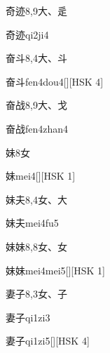 \begin{entry}{奇迹}{8,9}{⼤、⾡}
  \begin{phonetics}{奇迹}{qi2ji4}
  \end{phonetics}
\end{entry}

\begin{entry}{奋斗}{8,4}{⼤、⽃}
  \begin{phonetics}{奋斗}{fen4dou4}[][HSK 4]
  \end{phonetics}
\end{entry}

\begin{entry}{奋战}{8,9}{⼤、⼽}
  \begin{phonetics}{奋战}{fen4zhan4}
  \end{phonetics}
\end{entry}

\begin{entry}{妹}{8}{⼥}
  \begin{phonetics}{妹}{mei4}[][HSK 1]
  \end{phonetics}
\end{entry}

\begin{entry}{妹夫}{8,4}{⼥、⼤}
  \begin{phonetics}{妹夫}{mei4fu5}
  \end{phonetics}
\end{entry}

\begin{entry}{妹妹}{8,8}{⼥、⼥}
  \begin{phonetics}{妹妹}{mei4mei5}[][HSK 1]
  \end{phonetics}
\end{entry}

\begin{entry}{妻子}{8,3}{⼥、⼦}
  \begin{phonetics}{妻子}{qi1zi3}
  \end{phonetics}
  \begin{phonetics}{妻子}{qi1zi5}[][HSK 4]
  \end{phonetics}
\end{entry}


